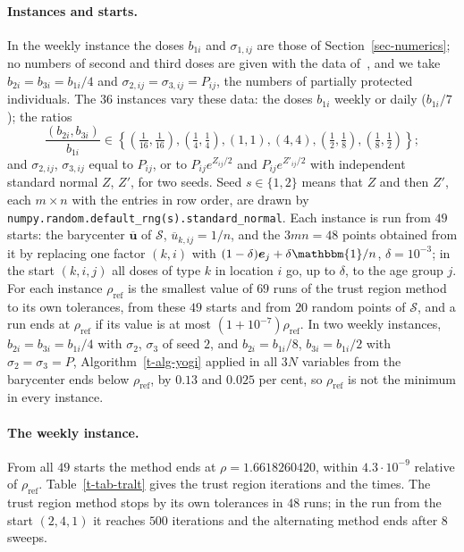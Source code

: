 \documentclass[11pt]{article}
\theoremstyle{plain}
\theoremstyle{definition}
\theoremstyle{remark}
\numberwithin{equation}{section}
\numberwithin{figure}{section}
\numberwithin{table}{section}
\numberwithin{algorithm}{section}
\begin{document}
\paragraph{Instances and starts.} In the weekly instance the doses $b_{1i}$
and $\sigma_{1,ij}$ are those of Section~\ref{sec-numerics}; no numbers of
second and third doses are given with the data of~\cite{JZh}, and we take
$b_{2i}=b_{3i}=b_{1i}/4$ and $\sigma_{2,ij}=\sigma_{3,ij}=P_{ij}$, the numbers
of partially protected individuals. The $36$ instances vary these data: the
doses $b_{1i}$ weekly or daily ($b_{1i}/7$); the ratios
\begin{equation*}
\frac{(b_{2i},b_{3i})}{b_{1i}}\in\left\{\left(\tfrac1{16},\tfrac1{16}\right),\left(\tfrac14,\tfrac14\right),(1,1),(4,4),\left(\tfrac12,\tfrac18\right),\left(\tfrac18,\tfrac12\right)\right\};
\end{equation*}
and $\sigma_{2,ij}$, $\sigma_{3,ij}$ equal to $P_{ij}$, or to
$P_{ij}e^{Z_{ij}/2}$ and $P_{ij}e^{Z'_{ij}/2}$ with independent standard normal
$Z$, $Z'$, for two seeds. Seed $s\in\{1,2\}$ means that $Z$ and then $Z'$, each
$m\times n$ with the entries in row order, are drawn by
\texttt{numpy.random.default\_rng(s).standard\_normal}. Each instance is run
from $49$ starts: the barycenter $\overline{\bm u}$ of $\mathcal{S}$,
$\overline u_{k,ij}=1/n$, and the $3mn=48$ points obtained from it by
replacing one factor $(k,i)$ with $(1-\delta)\bm e_j+\delta\mathbbm{1}/n$,
$\delta=10^{-3}$; in the start $(k,i,j)$ all doses of type $k$ in location $i$
go, up to $\delta$, to the age group $j$. For each instance $\rho_{\mathrm{ref}}$
is the smallest value of $69$ runs of the trust region method to its own
tolerances, from these $49$ starts and from $20$ random points of
$\mathcal{S}$, and a run ends at $\rho_{\mathrm{ref}}$ if its value is at most
$\left(1+10^{-7}\right)\rho_{\mathrm{ref}}$. In two weekly instances,
$b_{2i}=b_{3i}=b_{1i}/4$ with $\sigma_2$, $\sigma_3$ of seed $2$, and
$b_{2i}=b_{1i}/8$, $b_{3i}=b_{1i}/2$ with $\sigma_2=\sigma_3=P$,
Algorithm~\ref{t-alg-yogi} applied in all $3N$ variables from the barycenter
ends below $\rho_{\mathrm{ref}}$, by $0.13$ and $0.025$ per cent, so
$\rho_{\mathrm{ref}}$ is not the minimum in every instance.

\paragraph{The weekly instance.} From all $49$ starts the method ends at
$\rho=1.6618260420$, within $4.3\cdot 10^{-9}$ relative of
$\rho_{\mathrm{ref}}$. Table~\ref{t-tab-tralt} gives the trust region
iterations and the times. The trust region method stops by its own tolerances
in $48$ runs; in the run from the start $(2,4,1)$ it reaches $500$ iterations
and the alternating method ends after $8$ sweeps.
\end{document}
